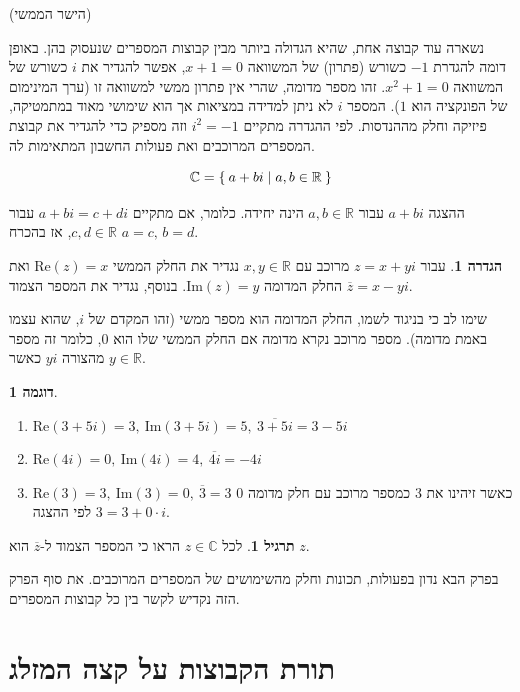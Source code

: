 \documentclass[12pt]{book}
\theoremstyle{plain}
\theoremstyle{definition}
\newtheorem{definition}[theorem]{הגדרה}
\newtheorem{example}[theorem]{דוגמה}
\newtheorem{exercise}[theorem]{תרגיל}
\newcommand{\R}{\mathbb R}
\newcommand{\C}{\mathbb C}
\begin{document}
\begin{center}
(הישר הממשי)
\end{center}

נשארה עוד קבוצה אחת, שהיא הגדולה ביותר מבין קבוצות המספרים שנעסוק
בהן. באופן דומה להגדרת $-1$ כשורש (פתרון) של המשוואה $x+1=0$,
אפשר להגדיר את $i$ כשורש של המשוואה $x^{2}+1=0$. זהו מספר
מדומה, שהרי אין פתרון ממשי למשוואה זו (ערך המינימום של הפונקציה הוא
$1$). המספר $i$ לא ניתן למדידה במציאות אך הוא שימושי מאוד
במתמטיקה, פיזיקה וחלק מההנדסות. לפי ההגדרה מתקיים $i^{2}=-1$
וזה מספיק כדי להגדיר את קבוצת המספרים המרוכבים ואת פעולות החשבון המתאימות
לה.

$$
\C=\Set{a+bi|a,b\in\R}
$$

ההצגה $a+bi$ עבור $a,b\in\R$ הינה יחידה. כלומר,
אם מתקיים $a+bi=c+di$ עבור $c,d\in\R$, אז בהכרח
$a=c,\,b=d$.

\begin{definition}
עבור $z=x+yi$ מרוכב עם $x,y\in\R$
נגדיר את החלק הממשי $\text{{Re}}(z)=x$ ואת החלק המדומה $\text{{Im}}(z)=y$.
בנוסף, נגדיר את המספר הצמוד $\overline{z}=x-yi$.
\end{definition}

שימו לב כי בניגוד לשמו, החלק המדומה הוא מספר ממשי (זהו המקדם של $i$,
שהוא עצמו באמת מדומה). מספר מרוכב נקרא מדומה אם החלק הממשי שלו הוא
$0$, כלומר זה מספר מהצורה $yi$ כאשר $y\in\R$.

\begin{example}\
\begin{enumerate}
\item $\text{{Re}}(3+5i)=3,\:\text{{Im}}(3+5i)=5,\:\overline{3+5i}=3-5i$
\item $\text{{Re}}(4i)=0,\:\text{{Im}}(4i)=4,\:\overline{4i}=-4i$
\item $\text{{Re}}(3)=3,\:\text{{Im}}(3)=0,\:\overline{3}=3$ כאשר
זיהינו את $3$ כמספר מרוכב עם חלק מדומה $0$ לפי ההצגה $3=3+0\cdot i$.
\end{enumerate}
\end{example}

\begin{exercise}
לכל $z\in\C$ הראו כי המספר הצמוד
ל-$\overline{z}$ הוא $z$.
\end{exercise}

בפרק הבא נדון בפעולות, תכונות וחלק מהשימושים של המספרים המרוכבים.
את סוף הפרק הזה נקדיש לקשר בין כל קבוצות המספרים.

\section{תורת הקבוצות על קצה המזלג}
\end{document}
